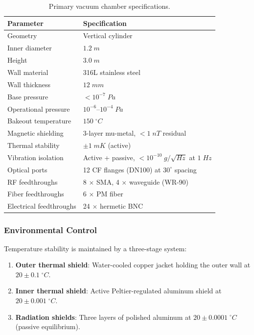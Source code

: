 \documentclass[aps,prd,twocolumn,superscriptaddress,nofootinbib]{revtex4-2}
\begin{document}
\begin{table}[h]
\centering
\caption{Primary vacuum chamber specifications.}
\label{tab:chamber}
\begin{ruledtabular}
\begin{tabular}{ll}
Parameter & Specification \\
\hline
Geometry & Vertical cylinder \\
Inner diameter & $1.2\;\si{m}$ \\
Height & $3.0\;\si{m}$ \\
Wall material & 316L stainless steel \\
Wall thickness & $12\;\si{mm}$ \\
Base pressure & $< 10^{-7}\;\si{Pa}$ \\
Operational pressure & $10^{-6}$--$10^{-4}\;\si{Pa}$ \\
Bakeout temperature & $150\;^\circ\si{C}$ \\
Magnetic shielding & 3-layer mu-metal, $< 1\;\si{nT}$ residual \\
Thermal stability & $\pm 1\;\si{mK}$ (active) \\
Vibration isolation & Active + passive, $< 10^{-10}\;\si{g/\sqrt{Hz}}$
at $1\;\si{Hz}$ \\
Optical ports & 12 CF flanges (DN100) at $30^\circ$ spacing \\
RF feedthroughs & 8 $\times$ SMA, 4 $\times$ waveguide (WR-90) \\
Fiber feedthroughs & 6 $\times$ PM fiber \\
Electrical feedthroughs & 24 $\times$ hermetic BNC \\
\end{tabular}
\end{ruledtabular}
\end{table}

\subsubsection{Environmental Control}

Temperature stability is maintained by a three-stage system:
\begin{enumerate}
\item \textbf{Outer thermal shield}: Water-cooled copper jacket
holding the outer wall at $20 \pm 0.1\;^\circ\si{C}$.
\item \textbf{Inner thermal shield}: Active Peltier-regulated
aluminum shield at $20 \pm 0.001\;^\circ\si{C}$.
\item \textbf{Radiation shields}: Three layers of polished
aluminum at $20 \pm 0.0001\;^\circ\si{C}$ (passive equilibrium).
\end{enumerate}
\end{document}
